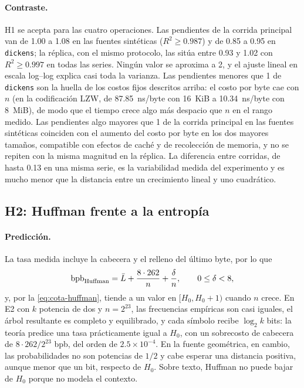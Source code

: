 \paragraph{Contraste.} H1 se acepta para las cuatro operaciones. Las pendientes de la corrida
principal van de 1.00 a 1.08 en las fuentes sintéticas ($R^2 \ge 0.987$) y de 0.85 a 0.95 en
\texttt{dickens}; la réplica, con el mismo protocolo, las sitúa entre 0.93 y 1.02 con
$R^2 \ge 0.997$ en todas las series. Ningún valor se aproxima a 2, y el ajuste lineal en escala
log--log explica casi toda la varianza. Las pendientes menores que 1 de \texttt{dickens} son la
huella de los costos fijos descritos arriba: el costo por byte cae con $n$ (en la codificación
LZW, de 87.85~ns/byte con 16~KiB a 10.34~ns/byte con 8~MiB), de modo que el tiempo crece algo
más despacio que $n$ en el rango medido. Las pendientes algo mayores que 1 de la corrida
principal en las fuentes sintéticas coinciden con el aumento del costo por byte en los dos
mayores tamaños, compatible con efectos de caché y de recolección de memoria, y no se repiten
con la misma magnitud en la réplica. La diferencia entre corridas, de hasta 0.13 en una misma
serie, es la variabilidad medida del experimento y es mucho menor que la distancia entre un
crecimiento lineal y uno cuadrático.

\subsection{H2: Huffman frente a la entropía}
\label{sec:disc-h2}
\paragraph{Predicción.} La tasa medida incluye la cabecera y el relleno del último byte, por lo
que
\begin{equation}
  \mathrm{bpb}_{\text{Huffman}} = \bar{L} + \frac{8 \cdot 262}{n} + \frac{\delta}{n}, \qquad 0 \le \delta < 8,
  \label{eq:bpb-huffman}
\end{equation}
y, por la \cref{eq:cota-huffman}, tiende a un valor en $[H_0, H_0 + 1)$ cuando $n$ crece. En
E2 con $k$ potencia de dos y $n = 2^{23}$, las frecuencias empíricas son casi iguales, el árbol
resultante es completo y equilibrado, y cada símbolo recibe $\log_2 k$ bits: la teoría predice
una tasa prácticamente igual a $H_0$, con un sobrecosto de cabecera de $8\cdot 262/2^{23}$ bpb,
del orden de $2.5\times10^{-4}$. En la fuente geométrica, en cambio, las probabilidades no son
potencias de $1/2$ y cabe esperar una distancia positiva, aunque menor que un bit, respecto de
$H_0$. Sobre texto, Huffman no puede bajar de $H_0$ porque no modela el contexto.


